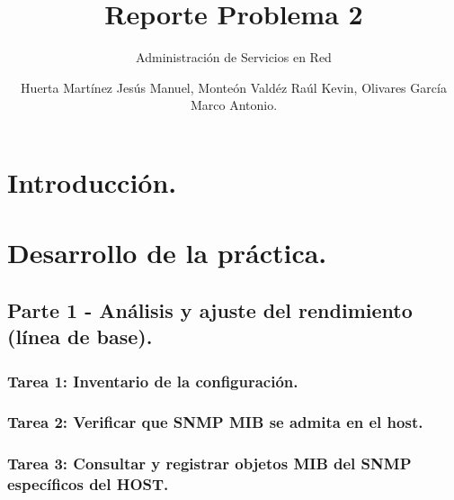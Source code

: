 \documentclass[oneside,10pt]{book}
\title{Reporte Problema 2}
\subtitle{Administración de Servicios en Red}
\author{Huerta Martínez Jesús Manuel, Monteón Valdéz Raúl Kevin, Olivares García Marco Antonio.}
\begin{document}
\maketitle
\thispagestyle{empty}

\frontmatter
\tableofcontents

\mainmatter


\chapter{Introducción.}



\chapter{Desarrollo de la práctica.}



\section{Parte 1 - Análisis y ajuste del rendimiento (línea de base).}

\subsection{Tarea 1: Inventario de la configuración.}

\subsection{Tarea 2: Verificar que SNMP MIB se admita en el host.}

\subsection{Tarea 3: Consultar y registrar objetos MIB del SNMP específicos del HOST.}
\end{document}
